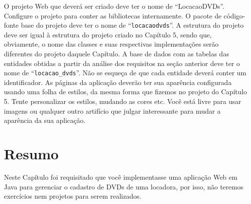 O projeto Web que deverá ser criado deve ter o nome de ``LocacaoDVDs''. Configure o projeto para conter as bibliotecas internamente. O pacote de código-fonte base do projeto deve ter o nome de ``\texttt{locacaodvds}''. A estrutura do projeto deve ser igual à estrutura do projeto criado no Capítulo 5, sendo que, obviamente, o nome das classes e suas respectivas implementações serão diferentes do projeto daquele Capítulo. A base de dados com as tabelas das entidades obtidas a partir da análise dos requisitos na seção anterior deve ter o nome de ``\texttt{locacao\_dvds}''. Não se esqueça de que cada entidade deverá conter um identificador. As páginas da aplicação deverão ter sua aparência configurada usando uma folha de estilos, da mesma forma que fizemos no projeto do Capítulo 5. Tente personalizar os estilos, mudando as cores etc. Você está livre para usar imagens ou qualquer outro artifício que julgar interessante para mudar a aparência da sua aplicação.


\section{Resumo}

Neste Capítulo foi requisitado que você implementasse uma aplicação Web em Java para gerenciar o cadastro de DVDs de uma locadora, por isso, não teremos exercícios nem projetos para serem realizados. 
